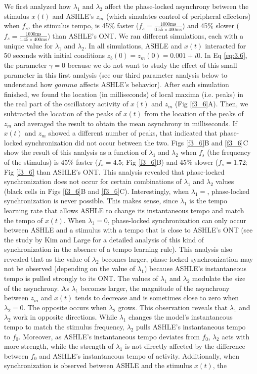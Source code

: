 \documentclass{report}
\begin{document}
We first analyzed how $\lambda_1$ and $\lambda_2$ affect the phase-locked asynchrony between the stimulus $x(t)$ and ASHLE's $z_m$ (which simulates control of peripheral effectors) when $f_s$, the stimulus tempo, is 45\% faster ($f_s = \frac{1000\text{ms}}{0.55 \times 400\text{ms}}$) and 45\% slower ($f_s = \frac{1000\text{ms}}{1.45 \times 400\text{ms}}$) than ASHLE's ONT. We ran different simulations, each with a unique value for $\lambda_1$ and $\lambda_2$. In all simulations, ASHLE and $x(t)$ interacted for 50 seconds with initial conditions $z_b(0)=z_m(0)=0.001 + i0$. In Eq \eqref{eq:3.6}, the parameter $\gamma=0$ because we do not want to study the effect of this small parameter in this first analysis (see our third parameter analysis below to understand how $gamma$ affects ASHLE's behavior). After each simulation finished, we found the location (in milliseconds) of local maxima (i.e. peaks) in the real part of the oscillatory activity of $x(t)$ and $z_m$ (Fig \ref{f3_6}A). Then, we subtracted the location of the peaks of $x(t)$ from the location of the peaks of $z_m$ and averaged the result to obtain the mean asynchrony in milliseconds. If $x(t)$ and $z_m$ showed a different number of peaks, that indicated that phase-locked synchronization did not occur between the two. Figs \ref{f3_6}B and \ref{f3_6}C show the result of this analysis as a function of $\lambda_1$ and $\lambda_2$ when $f_s$ (the frequency of the stimulus) is 45\% faster ($f_s = 4.5$; Fig \ref{f3_6}B) and 45\% slower ($f_s = 1.72$; Fig \ref{f3_6} than ASHLE's ONT. This analysis revealed that phase-locked synchronization does not occur for certain combinations of $\lambda_1$ and $\lambda_2$ values (black cells in Figs \ref{f3_6}B and \ref{f3_6}C). Interestingly, when $\lambda_1=$, phase-locked synchronization is never possible. This makes sense, since $\lambda_1$ is the tempo learning rate that allows ASHLE to change its instantaneous tempo and match the tempo of $x(t)$. When $\lambda_1=0$, phase-locked synchronization can only occur between ASHLE and a stimulus with a tempo that is close to ASHLE's ONT (see the study by Kim and Large \cite{kim2015signal} for a detailed analysis of this kind of synchronization in the absence of a tempo learning rule). This analysis also revealed that as the value of $\lambda_2$ becomes larger, phase-locked synchronization may not be observed (depending on the value of $\lambda_1$) because ASHLE's instantaneous tempo is pulled strongly to its ONT. The values of $\lambda_1$ and $\lambda_2$ modulate the size of the asynchrony. As $\lambda_1$ becomes larger, the magnitude of the asynchrony between $z_m$ and $x(t)$ tends to decrease and is sometimes close to zero when $\lambda_2=0$. The opposite occurs when $\lambda_2$ grows. This observation reveals that $\lambda_1$ and $\lambda_2$ work in opposite directions. While $\lambda_1$ changes the model's instantaneous tempo to match the stimulus frequency, $\lambda_2$ pulls ASHLE's instantaneous tempo to $f_0$. Moreover, as ASHLE's instantaneous tempo deviates from $f_0$, $\lambda_2$ acts with more strength, while the strength of $\lambda_1$ is not directly affected by the difference between $f_0$ and ASHLE's instantaneous tempo of activity. Additionally, when synchronization is observed between ASHLE and the stimulus $x(t)$, the 
\end{document}
